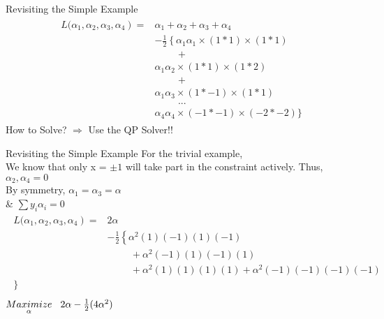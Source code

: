 \documentclass{beamer}
\begin{document}
\begin{frame}{Revisiting the Simple Example}
\begin{align*}
\begin{aligned}
\left.L(\alpha_{1},\alpha_{2},\alpha_{3},\alpha_{4}\right)=& \alpha_{1}+\alpha_{2}+\alpha_{3}+\alpha_{4} \\
&-\frac{1}{2}\left\{\alpha_{1} \alpha_{1}\times(1*1) \times(1 * 1)\right.\\
&\hspace{1cm} + \\
& \alpha_{1} \alpha_{2} \times(1*1) \times(1*2) \\
&\hspace{1cm}+\\
& \alpha_{1} \alpha_{3} \times(1*-1)\times(1*1)\\
& \hspace{1cm} ... \\
& \alpha_4\alpha_4 \times(-1*-1)\times(-2*-2)
\}
\end{aligned}
\end{align*}
How to Solve? $\Rightarrow$ Use the QP Solver!!
\end{frame}

\begin{frame}{Revisiting the Simple Example}
For the trivial example, \\
We know that only x = $\pm 1$ will take part in the constraint actively. Thus, $\alpha_2, \alpha_{4} = 0$ \\
\hspace{2cm} By symmetry, $\alpha_{1} = \alpha_{3} = \alpha $\\
\hspace{2cm} \& $\sum y_i\alpha_i = 0$
\begin{align*}
\begin{aligned}
\left.L(\alpha_{1},\alpha_{2},\alpha_{3},\alpha_{4}\right)=& 2\alpha \\
&-\frac{1}{2}\left\{\alpha^{2} (1)(-1)(1)(-1) \right. \\
&\hspace{1cm} + \alpha^{2} (-1)(1)(-1)(1) \\
&\hspace{1cm} + \alpha^{2} (1)(1)(1)(1) +  \alpha^{2} (-1)(-1)(-1)(-1) \\
\}\\
\end{aligned}
\end{align*}
\hspace{2cm} $\underset{\alpha}{Maximize} \hspace{3mm} 2\alpha - \frac{1}{2}(4\alpha^{2})$
\end{frame}
\end{document}
